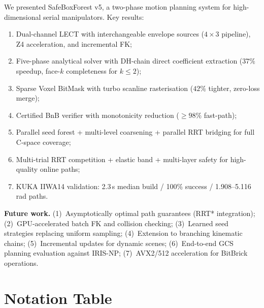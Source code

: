 \documentclass[journal]{IEEEtran}
\begin{document}
We presented SafeBoxForest v5, a two-phase motion planning system
for high-dimensional serial manipulators.
Key results:

\begin{enumerate}[nosep]
  \item Dual-channel LECT with interchangeable envelope sources
    ($4{\times}3$ pipeline), Z4 acceleration, and incremental FK;
  \item Five-phase analytical solver with DH-chain direct coefficient
    extraction ($37\%$ speedup, face-$k$ completeness for $k\leq 2$);
  \item Sparse Voxel BitMask with turbo scanline rasterisation ($42\%$
    tighter, zero-loss merge);
  \item Certified BnB verifier with monotonicity reduction
    ($\geq 98\%$ fast-path);
  \item Parallel seed forest + multi-level coarsening + parallel RRT
    bridging for full C-space coverage;
  \item Multi-trial RRT competition + elastic band + multi-layer safety
    for high-quality online paths;
  \item KUKA IIWA14 validation: 2.3\,s median build /
    100\% success / 1.908--5.116\,rad paths.
\end{enumerate}

\textbf{Future work.}
(1)~Asymptotically optimal path guarantees (RRT* integration);
(2)~GPU-accelerated batch FK and collision checking;
(3)~Learned seed strategies replacing uniform sampling;
(4)~Extension to branching kinematic chains;
(5)~Incremental updates for dynamic scenes;
(6)~End-to-end GCS planning evaluation against IRIS-NP;
(7)~AVX2/512 acceleration for BitBrick operations.

\appendix

\section{Notation Table}\label{app:notation}
\end{document}
